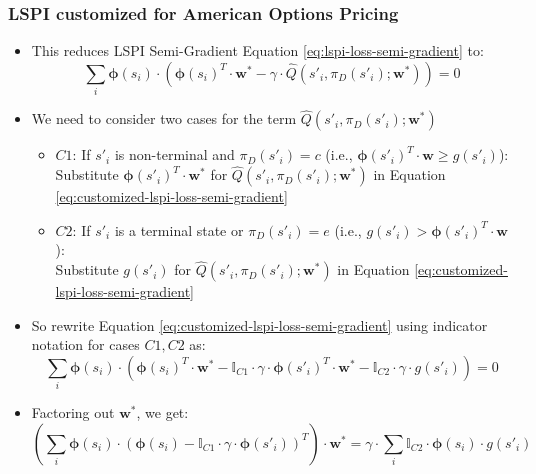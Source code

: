 \documentclass[handout]{beamer}
\begin{document}
\begin{frame}
\frametitle{LSPI customized for American Options Pricing}
\pause
\begin{itemize}[<+->]
\item This reduces LSPI Semi-Gradient Equation \eqref{eq:lspi-loss-semi-gradient} to:
\begin{equation}
\sum_i \bm{\phi}(s_i) \cdot (\bm{\phi}(s_i)^T \cdot \bm{w}^* - \gamma \cdot \hat{Q}(s'_i, \pi_D(s'_i); \bm{w}^*)) = 0
\label{eq:customized-lspi-loss-semi-gradient}
\end{equation}
\item We need to consider two cases for the term $\hat{Q}(s'_i, \pi_D(s'_i); \bm{w}^*)$
\begin{itemize} 
\item  $C1$: If $s'_i$ is non-terminal and $\pi_D(s'_i) = c$ (i.e., $\bm{\phi}(s'_i)^T \cdot \bm{w} \geq g(s'_i)$):\\
Substitute $\bm{\phi}(s'_i)^T \cdot \bm{w}^*$ for $\hat{Q}(s'_i,\pi_D(s'_i); \bm{w}^*)$ in Equation \eqref{eq:customized-lspi-loss-semi-gradient}
\item $C2$: If $s'_i$ is a terminal state or $\pi_D(s'_i) = e$ (i.e., $g(s'_i) > \bm{\phi}(s'_i)^T \cdot \bm{w}$):\\
Substitute $g(s'_i)$ for $\hat{Q}(s'_i,\pi_D(s'_i); \bm{w}^*)$ in Equation \eqref{eq:customized-lspi-loss-semi-gradient}
\end{itemize}
\item So rewrite Equation \eqref{eq:customized-lspi-loss-semi-gradient} using indicator notation for cases $C1, C2$ as:
$$\sum_i \bm{\phi}(s_i) \cdot (\bm{\phi}(s_i)^T \cdot \bm{w}^* - \mathbb{I}_{C1} \cdot \gamma \cdot \bm{\phi}(s'_i)^T \cdot \bm{w}^*  -  \mathbb{I}_{C2} \cdot \gamma \cdot g(s'_i)) = 0$$
\item Factoring out $\bm{w}^*$, we get:
$$(\sum_i \bm{\phi}(s_i) \cdot (\bm{\phi}(s_i) - \mathbb{I}_{C1} \cdot \gamma \cdot \bm{\phi}(s'_i))^T) \cdot \bm{w}^*= \gamma \cdot \sum_i  \mathbb{I}_{C2} \cdot \bm{\phi}(s_i) \cdot g(s'_i)$$


\end{itemize}
\end{frame}
\end{document}
